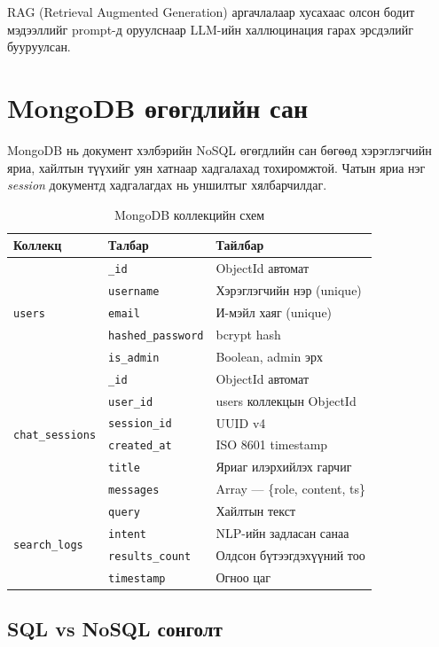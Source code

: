 \documentclass[12pt,a4paper]{report}
\begin{document}
RAG (Retrieval Augmented Generation) аргачлалаар хусахаас олсон бодит мэдээллийг prompt-д оруулснаар LLM-ийн халлюцинация гарах эрсдэлийг бууруулсан.

\section{MongoDB өгөгдлийн сан}

MongoDB \cite{mongoDB} нь документ хэлбэрийн NoSQL өгөгдлийн сан бөгөөд хэрэглэгчийн яриа, хайлтын түүхийг уян хатнаар хадгалахад тохиромжтой. Чатын яриа нэг \textit{session} документд хадгалагдах нь уншилтыг хялбарчилдаг.

\begin{table}[H]
\centering
\caption{MongoDB коллекцийн схем}
\label{tab:mongo_schema}
\begin{tabularx}{\textwidth}{@{}llX@{}}
\toprule
\textbf{Коллекц} & \textbf{Талбар} & \textbf{Тайлбар} \\
\midrule
\multirow{5}{*}{\texttt{users}} & \texttt{\_id} & ObjectId автомат \\
 & \texttt{username} & Хэрэглэгчийн нэр (unique) \\
 & \texttt{email} & И-мэйл хаяг (unique) \\
 & \texttt{hashed\_password} & bcrypt hash \\
 & \texttt{is\_admin} & Boolean, admin эрх \\
\midrule
\multirow{6}{*}{\texttt{chat\_sessions}} & \texttt{\_id} & ObjectId автомат \\
 & \texttt{user\_id} & users коллекцын ObjectId \\
 & \texttt{session\_id} & UUID v4 \\
 & \texttt{created\_at} & ISO 8601 timestamp \\
 & \texttt{title} & Яриаг илэрхийлэх гарчиг \\
 & \texttt{messages} & Array --- \{role, content, ts\} \\
\midrule
\multirow{4}{*}{\texttt{search\_logs}} & \texttt{query} & Хайлтын текст \\
 & \texttt{intent} & NLP-ийн задласан санаа \\
 & \texttt{results\_count} & Олдсон бүтээгдэхүүний тоо \\
 & \texttt{timestamp} & Огноо цаг \\
\bottomrule
\end{tabularx}
\end{table}

\subsection{SQL vs NoSQL сонголт}
\end{document}
